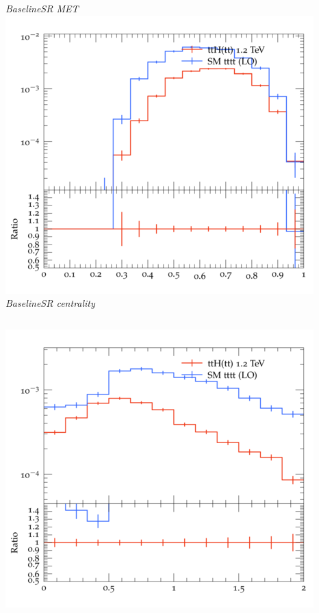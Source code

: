 \documentclass{beamer}
\begin{document}
\begin{frame}
\begin{columns}
\textit{\small BaselineSR MET}
\includegraphics[width=\textwidth]{../plots/ttH_1200/tttt_ttH_1LOS/BaselineSR_centrality.png}\\
\textit{\small BaselineSR centrality}
\end{columns}
\begin{columns}
\includegraphics[width=\textwidth]{../plots/ttH_1200/tttt_ttH_1LOS/BaselineSR_deltaR_bl_min.png}\\

\end{columns}
\end{frame}
\end{document}
